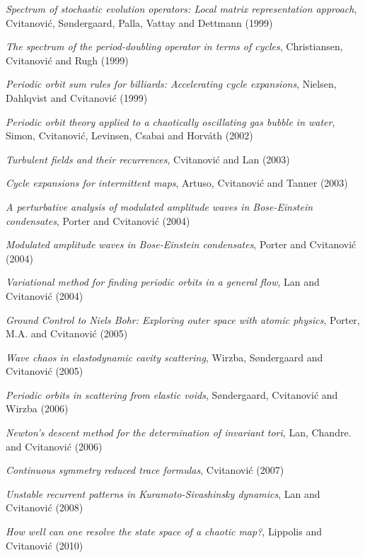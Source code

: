 {{
{\em Spectrum of stochastic evolution operators: {Local} matrix
representation approach},
{Cvitanovi{\'c}, S{\o}ndergaard, Palla, Vattay and Dettmann}
{(1999)}

{\em The spectrum of the period-doubling operator in terms of cycles},
{Christiansen, Cvitanovi{\'c} and Rugh}
{(1999)}

{\em Periodic orbit sum rules for billiards: {Accelerating} cycle expansions},
{Nielsen,  Dahlqvist and Cvitanovi{\'c}}
{(1999)}

{\em Periodic orbit theory applied to a chaotically oscillating gas
bubble in water},
{Simon, Cvitanovi{\'c}, Levinsen, Csabai and Horv\'ath}
{(2002)}

{\em Turbulent fields and their recurrences},
{Cvitanovi{\'c} and Lan}
{(2003)}

{\em Cycle expansions for intermittent maps},
{Artuso, Cvitanovi{\'c} and Tanner}
{(2003)}

{\em A perturbative analysis of modulated amplitude waves in {Bose-Einstein} condensates},
{Porter and Cvitanovi{\'c}}
{(2004)}

{\em Modulated amplitude waves in {Bose-Einstein} condensates},
{Porter and Cvitanovi{\'c}}
{(2004)}

{\em Variational method for finding periodic orbits in a general flow},
{Lan and Cvitanovi{\'c}}
{(2004)}

{\em {Ground Control} to {Niels Bohr: Exploring} outer space with atomic physics},
{Porter, M.A. and Cvitanovi{\'c}}
{(2005)}

{\em Wave chaos in elastodynamic cavity scattering},
{Wirzba, S{\o}ndergaard and Cvitanovi{\'c}}
{(2005)}

{\em Periodic orbits in scattering from elastic voids},
{S{\o}ndergaard, Cvitanovi{\'c} and Wirzba}
{(2006)}

{\em {Newton}'s descent method for the determination of invariant tori},
{Lan, Chandre. and Cvitanovi{\'c}}
{(2006)}

{\em Continuous symmetry reduced trace formulas},
{Cvitanovi{\'c}}
{(2007)}

{\em Unstable recurrent patterns in {Kuramoto-Sivashinsky} dynamics},
{Lan and Cvitanovi{\'c}}
{(2008)}

{\em How well can one resolve the state space of a chaotic map?},
{Lippolis and Cvitanovi{\'c}}
{(2010)}

}}
